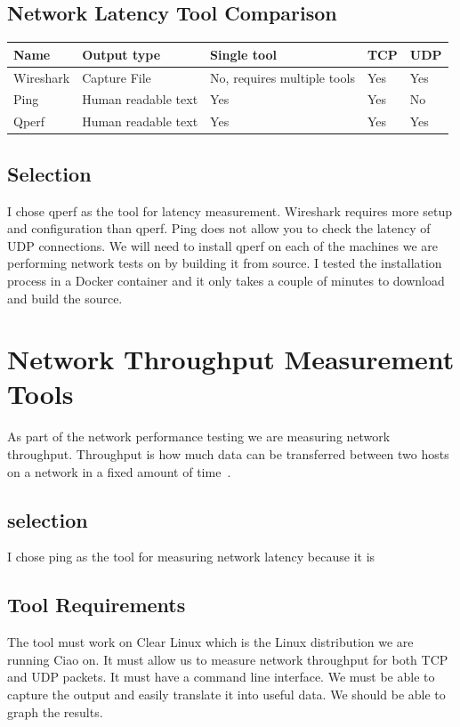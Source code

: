 \documentclass[10pt,letterpaper,onecolumn,draftclsnofoot]{IEEEtran}
\begin{document}
\subsection{Network Latency Tool Comparison}

\begin{center}
	\begin{tabular}{| l | l | l | l | l |}
		\hline
		Name & Output type & Single tool & TCP & UDP \\ \hline
		Wireshark & Capture File & No, requires multiple tools & Yes & Yes \\ \hline
		Ping & Human readable text & Yes & Yes & No \\ \hline
		Qperf & Human readable text & Yes & Yes & Yes \\ \hline
	\end{tabular}
\end{center}

\subsection{Selection}
I chose qperf as the tool for latency measurement.
Wireshark requires more setup and configuration than qperf.
Ping does not allow you to check the latency of UDP connections.
We will need to install qperf on each of the machines we are performing network tests on by building it from source.
I tested the installation process in a Docker container and it only takes a couple of minutes to download and build the source.

\section{Network Throughput Measurement Tools}
As part of the network performance testing we are measuring network throughput.
Throughput is how much data can be transferred between two hosts on a network in a fixed amount of time~\cite{topdown-ssl}.

\subsection{selection}
I chose ping as the tool for measuring network latency because it is 

\subsection{Tool Requirements}
The tool must work on Clear Linux which is the Linux distribution we are running Ciao on.
It must allow us to measure network throughput for both TCP and UDP packets. 
It must have a command line interface.
We must be able to capture the output and easily translate it into useful data. 
We should be able to graph the results. 
\end{document}
